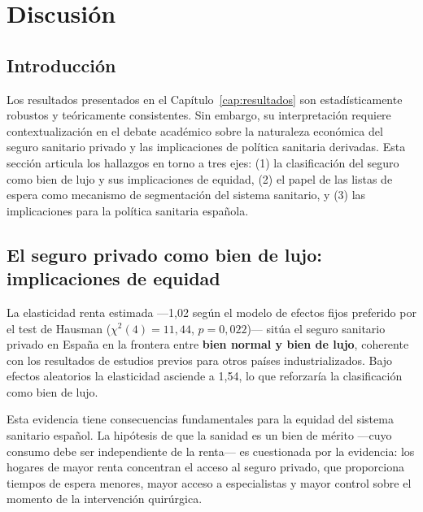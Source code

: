 \chapter{Discusión}
\label{cap:discusion}

\section{Introducción}

Los resultados presentados en el Capítulo~\ref{cap:resultados} son estadísticamente
robustos y teóricamente consistentes. Sin embargo, su interpretación requiere
contextualización en el debate académico sobre la naturaleza económica del seguro
sanitario privado y las implicaciones de política sanitaria derivadas. Esta sección
articula los hallazgos en torno a tres ejes: (1) la clasificación del seguro como
bien de lujo y sus implicaciones de equidad, (2) el papel de las listas de espera
como mecanismo de segmentación del sistema sanitario, y (3) las implicaciones para
la política sanitaria española.

\section{El seguro privado como bien de lujo: implicaciones de equidad}

La elasticidad renta estimada ---1{,}02 según el modelo de efectos fijos
preferido por el test de Hausman ($\chi^2(4) = 11{,}44$, $p = 0{,}022$)--- sitúa el
seguro sanitario privado en España en la frontera entre \textbf{bien normal y
bien de lujo}, coherente con los resultados de estudios previos para otros países
industrializados. Bajo efectos aleatorios la elasticidad asciende a 1{,}54, lo
que reforzaría la clasificación como bien de lujo.

Esta evidencia tiene consecuencias fundamentales para la equidad del sistema
sanitario español. La hipótesis de que la sanidad es un bien de mérito ---cuyo
consumo debe ser independiente de la renta--- es cuestionada por la evidencia: los
hogares de mayor renta concentran el acceso al seguro privado, que proporciona
tiempos de espera menores, mayor acceso a especialistas y mayor control sobre el
momento de la intervención quirúrgica.

